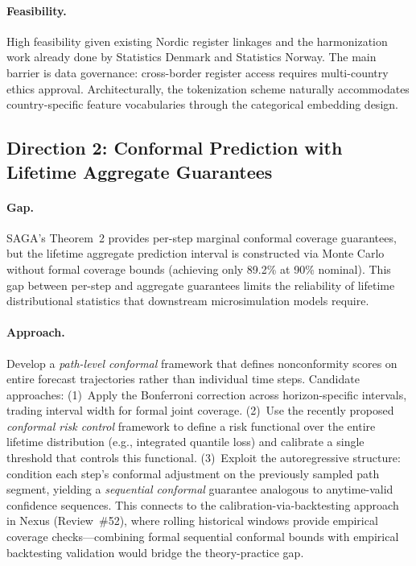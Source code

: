 \documentclass[11pt,a4paper]{article}
\begin{document}
\paragraph{Feasibility.}
High feasibility given existing Nordic register linkages and the harmonization work already done by Statistics Denmark and Statistics Norway. The main barrier is data governance: cross-border register access requires multi-country ethics approval. Architecturally, the tokenization scheme naturally accommodates country-specific feature vocabularies through the categorical embedding design.

\subsection*{Direction 2: Conformal Prediction with Lifetime Aggregate Guarantees}

\paragraph{Gap.}
SAGA's Theorem~2 provides per-step marginal conformal coverage guarantees, but the lifetime aggregate prediction interval is constructed via Monte Carlo without formal coverage bounds (achieving only 89.2\% at 90\% nominal). This gap between per-step and aggregate guarantees limits the reliability of lifetime distributional statistics that downstream microsimulation models require.

\paragraph{Approach.}
Develop a \emph{path-level conformal} framework that defines nonconformity scores on entire forecast trajectories rather than individual time steps. Candidate approaches: (1)~Apply the Bonferroni correction across horizon-specific intervals, trading interval width for formal joint coverage. (2)~Use the recently proposed \emph{conformal risk control} framework to define a risk functional over the entire lifetime distribution (e.g., integrated quantile loss) and calibrate a single threshold that controls this functional. (3)~Exploit the autoregressive structure: condition each step's conformal adjustment on the previously sampled path segment, yielding a \emph{sequential conformal} guarantee analogous to anytime-valid confidence sequences. This connects to the calibration-via-backtesting approach in Nexus (Review~\#52), where rolling historical windows provide empirical coverage checks---combining formal sequential conformal bounds with empirical backtesting validation would bridge the theory-practice gap.
\end{document}
